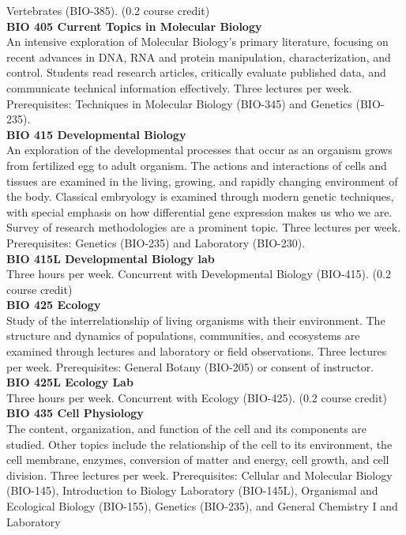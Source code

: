 \documentclass[
  letterpaper,
]{scrbook}
\begin{document}
Vertebrates (BIO-385). (0.2 course credit)\\
\textbf{BIO 405 Current Topics in Molecular Biology}\\
An intensive exploration of Molecular Biology's primary literature,
focusing on recent advances in DNA, RNA and protein manipulation,
characterization, and control. Students read research articles,
critically evaluate published data, and communicate technical
information effectively. Three lectures per week. Prerequisites:
Techniques in Molecular Biology (BIO-345) and Genetics (BIO-235).\\
\textbf{BIO 415 Developmental Biology}\\
An exploration of the developmental processes that occur as an organism
grows from fertilized egg to adult organism. The actions and
interactions of cells and tissues are examined in the living, growing,
and rapidly changing environment of the body. Classical embryology is
examined through modern genetic techniques, with special emphasis on how
differential gene expression makes us who we are. Survey of research
methodologies are a prominent topic. Three lectures per week.
Prerequisites: Genetics (BIO-235) and Laboratory (BIO-230).\\
\textbf{BIO 415L Developmental Biology lab}\\
Three hours per week. Concurrent with Developmental Biology (BIO-415).
(0.2 course credit)\\
\textbf{BIO 425 Ecology}\\
Study of the interrelationship of living organisms with their
environment. The structure and dynamics of populations, communities, and
ecosystems are examined through lectures and laboratory or field
observations. Three lectures per week. Prerequisites: General Botany
(BIO-205) or consent of instructor.\\
\textbf{BIO 425L Ecology Lab}\\
Three hours per week. Concurrent with Ecology (BIO-425). (0.2 course
credit)\\
\textbf{BIO 435 Cell Physiology}\\
The content, organization, and function of the cell and its components
are studied. Other topics include the relationship of the cell to its
environment, the cell membrane, enzymes, conversion of matter and
energy, cell growth, and cell division. Three lectures per week.
Prerequisites: Cellular and Molecular Biology (BIO-145), Introduction to
Biology Laboratory (BIO-145L), Organismal and Ecological Biology
(BIO-155), Genetics (BIO-235), and General Chemistry I and Laboratory
\end{document}
